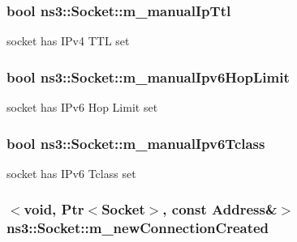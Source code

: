 \subsubsection[{\texorpdfstring{m\+\_\+manual\+Ip\+Ttl}{m_manualIpTtl}}]{\setlength{\rightskip}{0pt plus 5cm}bool ns3\+::\+Socket\+::m\+\_\+manual\+Ip\+Ttl\hspace{0.3cm}{\ttfamily [private]}}\hypertarget{classns3_1_1Socket_acfae11c5bc1df294d7a27bd1fda80bfd}{}\label{classns3_1_1Socket_acfae11c5bc1df294d7a27bd1fda80bfd}


socket has I\+Pv4 T\+TL set 

\subsubsection[{\texorpdfstring{m\+\_\+manual\+Ipv6\+Hop\+Limit}{m_manualIpv6HopLimit}}]{\setlength{\rightskip}{0pt plus 5cm}bool ns3\+::\+Socket\+::m\+\_\+manual\+Ipv6\+Hop\+Limit\hspace{0.3cm}{\ttfamily [private]}}\hypertarget{classns3_1_1Socket_a2edb76a5e05c19ef6b97fb2516dfbe58}{}\label{classns3_1_1Socket_a2edb76a5e05c19ef6b97fb2516dfbe58}


socket has I\+Pv6 Hop Limit set 

\subsubsection[{\texorpdfstring{m\+\_\+manual\+Ipv6\+Tclass}{m_manualIpv6Tclass}}]{\setlength{\rightskip}{0pt plus 5cm}bool ns3\+::\+Socket\+::m\+\_\+manual\+Ipv6\+Tclass\hspace{0.3cm}{\ttfamily [private]}}\hypertarget{classns3_1_1Socket_acb85c7152d0483f0e8650acd52a7fc72}{}\label{classns3_1_1Socket_acb85c7152d0483f0e8650acd52a7fc72}


socket has I\+Pv6 Tclass set 

\subsubsection[{\texorpdfstring{m\+\_\+new\+Connection\+Created}{m_newConnectionCreated}}]{$<$void, {\bf Ptr}$<${\bf Socket}$>$, const {\bf Address}\&$>$ ns3\+::\+Socket\+::m\+\_\+new\+Connection\+Created\hspace{0.3cm}{\ttfamily [private]}}\hypertarget{classns3_1_1Socket_acc065ce65a4c63ce212d07987a9beb37}{}\label{classns3_1_1Socket_acc065ce65a4c63ce212d07987a9beb37}


